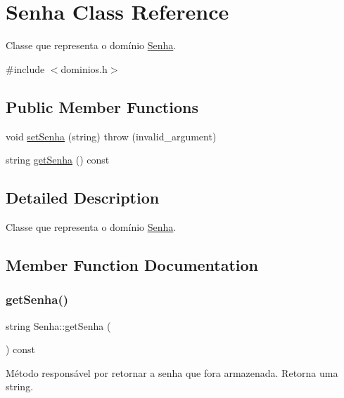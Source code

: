 \hypertarget{classSenha}{}\section{Senha Class Reference}
\label{classSenha}


Classe que representa o domínio \hyperlink{classSenha}{Senha}.  




{\ttfamily \#include $<$dominios.\+h$>$}

\subsection*{Public Member Functions}
\begin{DoxyCompactItemize}
\item 
void \hyperlink{classSenha_a735e4bf5f65cc8d28daa7dbf202fd999}{set\+Senha} (string)  throw (invalid\+\_\+argument)
\item 
string \hyperlink{classSenha_a1cc904431d0a8287d0b22dee3e9d34ae}{get\+Senha} () const
\end{DoxyCompactItemize}


\subsection{Detailed Description}
Classe que representa o domínio \hyperlink{classSenha}{Senha}. 

\subsection{Member Function Documentation}
\mbox{\label{classSenha_a1cc904431d0a8287d0b22dee3e9d34ae}} 
\subsubsection{\texorpdfstring{get\+Senha()}{getSenha()}}
{\footnotesize\ttfamily string Senha\+::get\+Senha (\begin{DoxyParamCaption}{ }\end{DoxyParamCaption}) const\hspace{0.3cm}{\ttfamily [inline]}}

Método responsável por retornar a senha que fora armazenada. Retorna uma string. \mbox{\label{classSenha_a735e4bf5f65cc8d28daa7dbf202fd999}} 
